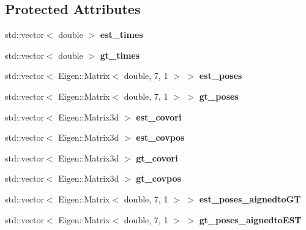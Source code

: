 \subsection*{Protected Attributes}
\begin{DoxyCompactItemize}
\item 
\mbox{\label{classov__eval_1_1ResultTrajectory_a2e78209342b80d1ac3115bad38ef397c}} 
std\+::vector$<$ double $>$ {\bfseries est\+\_\+times}
\item 
\mbox{\label{classov__eval_1_1ResultTrajectory_a7d985814985338546e06b9a5a49b153e}} 
std\+::vector$<$ double $>$ {\bfseries gt\+\_\+times}
\item 
\mbox{\label{classov__eval_1_1ResultTrajectory_af603360e09c66c552f08f144aa399b4b}} 
std\+::vector$<$ Eigen\+::\+Matrix$<$ double, 7, 1 $>$ $>$ {\bfseries est\+\_\+poses}
\item 
\mbox{\label{classov__eval_1_1ResultTrajectory_a27988db61fab2b6154665c5cf5f5eb66}} 
std\+::vector$<$ Eigen\+::\+Matrix$<$ double, 7, 1 $>$ $>$ {\bfseries gt\+\_\+poses}
\item 
\mbox{\label{classov__eval_1_1ResultTrajectory_a80f44e2b04fafe8114962438abe9164a}} 
std\+::vector$<$ Eigen\+::\+Matrix3d $>$ {\bfseries est\+\_\+covori}
\item 
\mbox{\label{classov__eval_1_1ResultTrajectory_a4b3adeb0603f3197484be750db827b39}} 
std\+::vector$<$ Eigen\+::\+Matrix3d $>$ {\bfseries est\+\_\+covpos}
\item 
\mbox{\label{classov__eval_1_1ResultTrajectory_add4899b2111a01e8e3ea9d29618b0ce4}} 
std\+::vector$<$ Eigen\+::\+Matrix3d $>$ {\bfseries gt\+\_\+covori}
\item 
\mbox{\label{classov__eval_1_1ResultTrajectory_a32637a737e1bb09cfe0d6e71fa3d8ccd}} 
std\+::vector$<$ Eigen\+::\+Matrix3d $>$ {\bfseries gt\+\_\+covpos}
\item 
\mbox{\label{classov__eval_1_1ResultTrajectory_a9dfef04471027bb002081c55674e41d9}} 
std\+::vector$<$ Eigen\+::\+Matrix$<$ double, 7, 1 $>$ $>$ {\bfseries est\+\_\+poses\+\_\+aignedto\+GT}
\item 
\mbox{\label{classov__eval_1_1ResultTrajectory_a39957e134124c8f5cc61522df94a03fe}} 
std\+::vector$<$ Eigen\+::\+Matrix$<$ double, 7, 1 $>$ $>$ {\bfseries gt\+\_\+poses\+\_\+aignedto\+E\+ST}
\end{DoxyCompactItemize}


